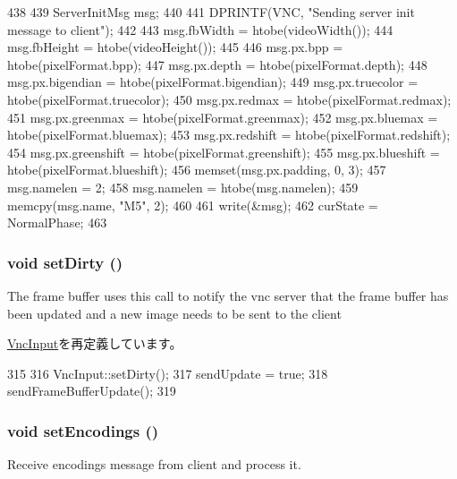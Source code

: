 \begin{DoxyCode}
438 {
439     ServerInitMsg msg;
440 
441     DPRINTF(VNC, "Sending server init message to client\n");
442 
443     msg.fbWidth = htobe(videoWidth());
444     msg.fbHeight = htobe(videoHeight());
445 
446     msg.px.bpp = htobe(pixelFormat.bpp);
447     msg.px.depth = htobe(pixelFormat.depth);
448     msg.px.bigendian = htobe(pixelFormat.bigendian);
449     msg.px.truecolor = htobe(pixelFormat.truecolor);
450     msg.px.redmax = htobe(pixelFormat.redmax);
451     msg.px.greenmax = htobe(pixelFormat.greenmax);
452     msg.px.bluemax = htobe(pixelFormat.bluemax);
453     msg.px.redshift = htobe(pixelFormat.redshift);
454     msg.px.greenshift = htobe(pixelFormat.greenshift);
455     msg.px.blueshift = htobe(pixelFormat.blueshift);
456     memset(msg.px.padding, 0, 3);
457     msg.namelen = 2;
458     msg.namelen = htobe(msg.namelen);
459     memcpy(msg.name, "M5", 2);
460 
461     write(&msg);
462     curState = NormalPhase;
463 }
\end{DoxyCode}
\hypertarget{classVncServer_a92a590790db6444ca7a79eaf5fbcb0d9}{
\subsubsection[{setDirty}]{\setlength{\rightskip}{0pt plus 5cm}void setDirty ()}}
\label{classVncServer_a92a590790db6444ca7a79eaf5fbcb0d9}
The frame buffer uses this call to notify the vnc server that the frame buffer has been updated and a new image needs to be sent to the client 

\hyperlink{classVncInput_ad7eac728ea55298c7691e7d1c165719b}{VncInput}を再定義しています。


\begin{DoxyCode}
315     {
316         VncInput::setDirty();
317         sendUpdate = true;
318         sendFrameBufferUpdate();
319     }
\end{DoxyCode}
\hypertarget{classVncServer_a840599118004b7df093bd78b6a21e56b}{
\subsubsection[{setEncodings}]{\setlength{\rightskip}{0pt plus 5cm}void setEncodings ()}}
\label{classVncServer_a840599118004b7df093bd78b6a21e56b}
Receive encodings message from client and process it. 


